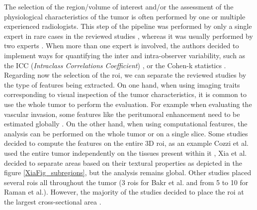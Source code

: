 The selection of the region/volume of interest and/or the assessment of
the physiological characteristics of the tumor is often performed by one
or multiple experienced radiologists.
This step of the pipeline was performed by only a single expert in rare
cases in the reviewed studies \cite{Xia2018,Akai2018}, whereas it was
usually performed by two experts \cite{Zhou2017a,Chen2017,Li2016,Raman2015,Kuo2007,Renzulli2016,Segal2007,Zheng2018,Peng2018,Taouli2017}.
When more than one expert is involved, the authors decided to implement
ways for quantifying the inter and intra-observer variability, such as
the ICC (\emph{Intraclass Correlations Coefficient}) \cite{Zheng2018,Li2016}, or the Cohen-k statistics \cite{Renzulli2016,Banerjee2015}.
Regarding now the selection of the \ac{roi}, we can separate the reviewed
studies by the type of features being extracted.
On one hand, when using imaging traits corresponding to visual inspection of the tumor characteristics, it is common to use the whole tumor to perform the evaluation. For example when evaluating the
vascular invasion, some features like the peritumoral enhancement need
to be estimated globally \cite{Renzulli2016,Banerjee2015,Segal2007,Kuo2007}.
On the other hand, when using computational features, the analysis can
be performed on the whole tumor or on a single slice. Some studies
decided to compute the features on the entire 3D \ac{roi}, as an example
 Cozzi et al. \cite{Cozzi2017} used the entire tumor independently on
the tissues present within it , Xia et al. \cite{Xia2018} decided to separate
areas based on their textural properties  as depicted in the figure \ref{XiaFig_subregions}, but the
analysis remains global. Other studies placed several \ac{roi}s all throughout
the tumor (3 \ac{roi}s for Bakr et al. and from 5 to 10 for
Raman et al.). However, the majority of the studies decided to
place the \ac{roi} at the largest cross-sectional area \cite{Li2016,Chen2017,Zhou2017a,Akai2018,Zheng2018}.

